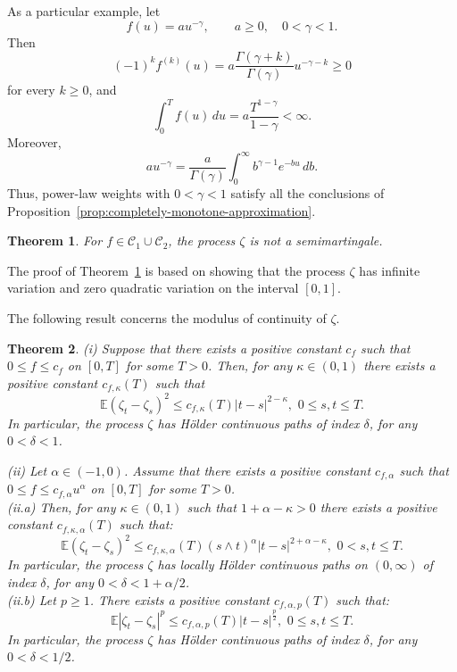 \documentclass[preprint,12pt,authoryear]{elsarticle}
\def\E{\mathbb{E}}
\newtheorem{thm}{Theorem}
\begin{document}
\begin{rem}
As a particular example, let
\[
f(u)=a u^{-\gamma},
\qquad
a\geq0,\quad 0<\gamma<1.
\]
Then
\[
(-1)^k f^{(k)}(u)
=
a\frac{\Gamma(\gamma+k)}{\Gamma(\gamma)}
u^{-\gamma-k}
\geq0
\]
for every \(k\geq0\), and
\[
\int_0^T f(u)\,du
=
a\frac{T^{1-\gamma}}{1-\gamma}
<\infty.
\]
Moreover,
\[
a u^{-\gamma}
=
\frac{a}{\Gamma(\gamma)}
\int_0^\infty b^{\gamma-1}e^{-bu}\,db.
\]
Thus, power-law weights with \(0<\gamma<1\) satisfy all the conclusions
of Proposition~\ref{prop:completely-monotone-approximation}.
\end{rem}

\begin{thm} \label{not-semimartingale}
    For \(f \in \mathcal{C}_1 \cup \mathcal{C}_2\), the process $\zeta$ is not a semimartingale. 
\end{thm}
The proof of Theorem~\ref{not-semimartingale} is based on showing that the process \( \zeta \) has infinite variation and zero quadratic variation on the interval \([0,1]\).

The following result concerns the modulus of continuity of \( \zeta \).
\begin{thm}\label{teo3}
(i)    Suppose that there exists a positive constant $c_{f}$ such that $0\leq f\leq c_f$ on $[0,T]$ for some $T>0$. Then,  for any $\kappa\in(0,1)$ there exists a positive constant $c_{f,\kappa}(T)$ such that
\begin{equation*}
        \E(\zeta_{t}-\zeta_{s})^2\leq  c_{f,\kappa}(T)|t-s|^{2-\kappa},\,\,  0\leq s,t\leq T.
\end{equation*}
In particular, the process $\zeta$ has Hölder continuous paths of index $\delta$, for any $0<\delta<1$.

(ii) Let $\alpha \in (-1,0)$. Assume that there exists a positive constant $c_{f,\alpha}$ such that $0\leq f\leq c_{f,\alpha}u^{\alpha}$ on $[0,T]$ for some $T>0$.
\\(ii.a) Then,  for any $\kappa\in(0,1)$ such that $1+\alpha-\kappa>0$ there exists a positive constant $c_{f,\kappa,\alpha}(T)$ such that:
\begin{equation*}\label{continuity2}
        \E(\zeta_{t}-\zeta_{s})^2\leq  c_{f,\kappa,\alpha}(T)(s\wedge t)^{\alpha}|t-s|^{2+\alpha-\kappa},\,\, 0< s, t\leq T.
\end{equation*}
In particular, the process $\zeta$ has locally Hölder continuous paths on $(0,\infty)$ of index $\delta$, for any $0<\delta<1+\alpha/2$.
\\(ii.b) Let $p\geq 1$. There exists a positive constant $c_{f,\alpha,p}(T)$ such that:
\begin{equation}\label{continuity2a}
        \E|\zeta_{t}-\zeta_{s}|^p\leq  c_{f,\alpha,p}(T)|t-s|^{\frac{p}{2}},\,\, 0\leq s,t\leq T.
\end{equation}
In particular, the process $\zeta$ has Hölder continuous paths of index $\delta$, for any $0<\delta<1/2$.
\end{thm}
\end{document}
